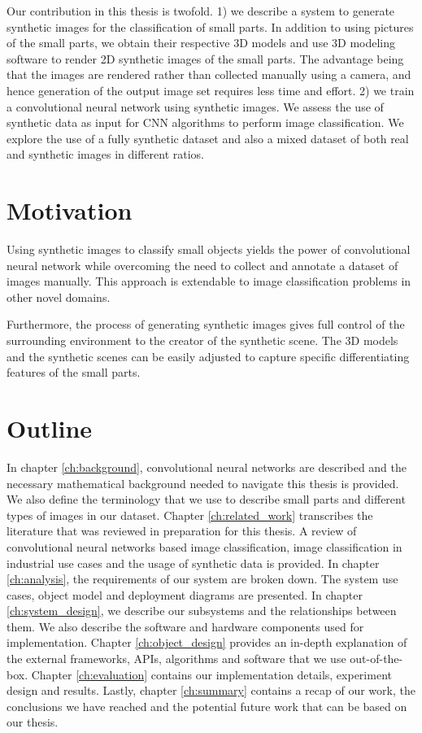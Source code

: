 Our contribution in this thesis is twofold. 1) we describe a system to generate synthetic images for the classification of small parts. In addition to using pictures of the small parts, we obtain their respective 3D models and use 3D modeling software to render 2D synthetic images of the small parts. The advantage being that the images are rendered rather than collected manually using a camera, and hence generation of the output image set requires less time and effort. 2) we train a convolutional neural network using synthetic images. We assess the use of synthetic data as input for CNN algorithms to perform image classification. We explore the use of a fully synthetic dataset and also a mixed dataset of both real and synthetic images in different ratios.

\section{Motivation}

Using synthetic images to classify small objects yields the power of convolutional neural network while overcoming the need to collect and annotate a dataset of images manually. This approach is extendable to image classification problems in other novel domains.

Furthermore, the process of generating synthetic images gives full control of the surrounding environment to the creator of the synthetic scene. The 3D models and the synthetic scenes can be easily adjusted to capture specific differentiating features of the small parts.

\section{Outline}
In chapter \ref{ch:background}, convolutional neural networks are described and the necessary mathematical background needed to navigate this thesis is provided. We also define the terminology that we use to describe small parts and different types of images in our dataset. Chapter \ref{ch:related_work} transcribes the literature that was reviewed in preparation for this thesis. A review of convolutional neural networks based image classification, image classification in industrial use cases and the usage of synthetic data is provided. In chapter \ref{ch:analysis}, the requirements of our system are broken down. The system use cases, object model and deployment diagrams are presented. In chapter \ref{ch:system_design}, we describe our subsystems and the relationships between them. We also describe the software and hardware components used for implementation. Chapter \ref{ch:object_design} provides an in-depth explanation of the external frameworks, APIs, algorithms and software that we use out-of-the-box. Chapter \ref{ch:evaluation} contains our implementation details, experiment design and results. Lastly, chapter \ref{ch:summary} contains a recap of our work, the conclusions we have reached and the potential future work that can be based on our thesis.
